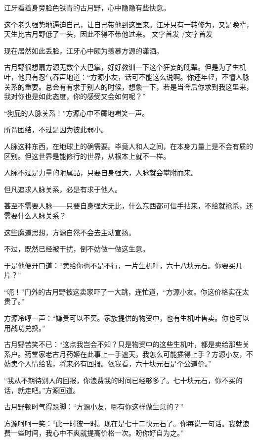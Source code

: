 
\begin{this_body}

江牙看着身旁脸色铁青的古月野，心中隐隐有些快意。

这个老头强势地逼迫自己，让自己带他到这里来。江牙只有一转修为，又是晚辈，天生比古月野低了一头，因此不得不带他过来。 文字首发 /文字首发

现在居然如此丢脸，江牙心中颇为羡慕方源的潇洒。

古月野很想扇方源无数个大巴掌，好好教训一下这个狂妄的晚辈。但是为了生机叶，他只有忍气吞声地道：“方源小友，话可不能这么说啊。你还年轻，不懂人脉关系的重要。总会有有求于别人的时候，想象一下，若是当今后你求到我这里来，我对你也是如此态度，你的感受又会如何呢？”

“狗屁的人脉关系！”方源心中不屑地嗤笑一声。

所谓团结，不过是因为彼此弱小。

人脉这种东西，在地球上的确需要。毕竟人和人之间，在本身力量上是不会有质的区别。但这世界是能修行的世界，从根本上就不一样。

人脉不过是力量的附属品，只要自身强大，人脉就会攀附而来。

但凡追求人脉关系，必是有求于他人。

甚至不需要人脉——只要自身强大无比，什么东西都可信手拈来，不给就抢杀，还需要什么人脉关系？

这些魔道思想，方源自然不会去主动宣扬。

不过，既然已经被干扰，倒不妨做一做这生意。

于是他便开口道：“卖给你也不是不行，一片生机叶，六十八块元石。你要买几片？”

“呃！”门外的古月野被这卖家吓了一大跳，连忙道，“方源小友。你这价格实在太贵了。”

方源冷哼一声：“嫌贵可以不买。家族提供的物资中，也有生机叶售卖。你也可以用战功兑换。”

古月野苦笑不已：“这点我岂会不知？只是物资中的这些生机叶，都是卖给那些关系户。药堂家老古月药姬在此事上一手遮天，我怎么可能插得上手？方源小友，不妨卖个人情给我，将来必有回报。依我看，六十块元石是个公道价。”

“我从不期待别人的回报，你浪费我的时间已经够多了。七十块元石，你不买的话，就走吧。”方源回道。

古月野顿时气得跺脚：“方源小友，哪有你这样做生意的？”

方源呵呵一笑：“此一时彼一时。现在是七十二快元石了。你每说一句话。我就浪费一些时间，我心中不爽就提高价格一次。盼你好自为之。”


\end{this_body}
